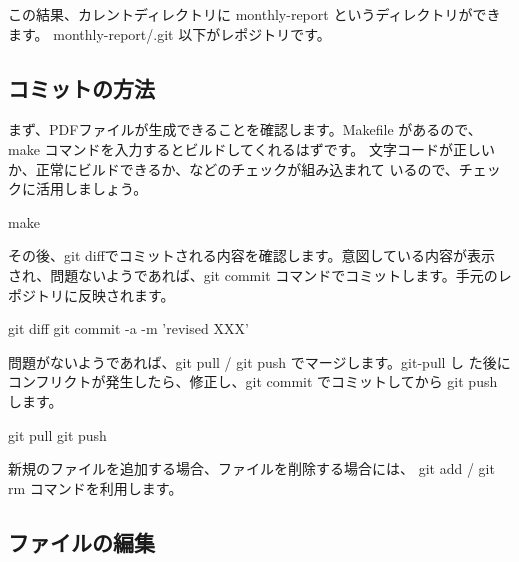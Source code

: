 \documentclass[mingoth,a4paper]{jsarticle}
\begin{document}
この結果、カレントディレクトリに monthly-report というディレクトリができ
ます。
monthly-report/.git 以下がレポジトリです。


\subsection{コミットの方法}

まず、PDFファイルが生成できることを確認します。Makefile があるので、make 
コマンドを入力するとビルドしてくれるはずです。
文字コードが正しいか、正常にビルドできるか、などのチェックが組み込まれて
いるので、チェックに活用しましょう。

\begin{commandline}
 make
\end{commandline}

その後、git diffでコミットされる内容を確認します。意図している内容が表示
され、問題ないようであれば、git commit コマンドでコミットします。手元のレ
ポジトリに反映されます。

\begin{commandline}
 git diff
 git commit -a -m 'revised XXX'
\end{commandline}

問題がないようであれば、git pull / git push でマージします。git-pull し
た後にコンフリクトが発生したら、修正し、git commit でコミットしてから
git push します。

\begin{commandline}
 git pull 
 git push 
\end{commandline}

新規のファイルを追加する場合、ファイルを削除する場合には、 git add /
git rm コマンドを利用します。

\subsection{ファイルの編集}
\end{document}
